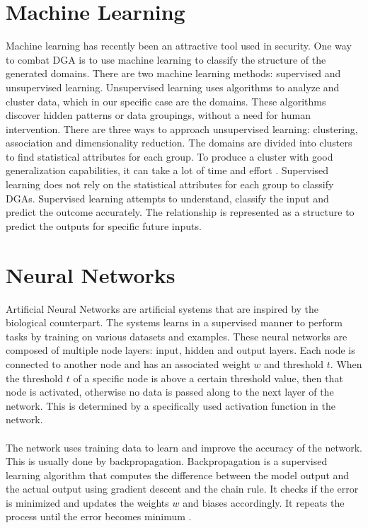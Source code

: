 \section{Machine Learning}
Machine learning has recently been an attractive tool used in security. One way to combat DGA is to use machine learning to classify the structure of the generated domains. There are two machine learning methods: supervised and unsupervised learning. Unsupervised learning uses algorithms to analyze and cluster data, which in our specific case are the domains. These algorithms discover hidden patterns or data groupings, without a need for human intervention. There are three ways to approach unsupervised learning: clustering, association and dimensionality reduction. The domains are divided into clusters to find statistical attributes for each group. To produce a cluster with good generalization capabilities, it can take a lot of time and effort \cite{Unsupervised}. Supervised learning does not rely on the statistical attributes for each group to classify DGAs. Supervised learning attempts to understand, classify the input and predict the outcome accurately. The relationship is represented as a structure to predict the outputs for specific future inputs. 

\pagebreak

\section{Neural Networks}
Artificial Neural Networks are artificial systems that are inspired by the biological counterpart. The systems learns in a supervised manner to perform tasks by training on various datasets and examples. These neural networks are composed of multiple node layers: input, hidden and output layers. Each node is connected to another node and has an associated weight $w$ and threshold $t$. When the threshold $t$ of a specific node is above a certain threshold value, then that node is activated, otherwise no data is passed along to the next layer of the network. This is determined by a specifically used activation function in the network.\\\\
The network uses training data to learn and improve the accuracy of the network. This is usually done by backpropagation. Backpropagation is a supervised learning algorithm that computes the difference between the model output and the actual output using gradient descent and the chain rule. It checks if the error is minimized and updates the weights $w$ and biases accordingly. It repeats the process until the error becomes minimum \cite{Gradient_Descent}. 

